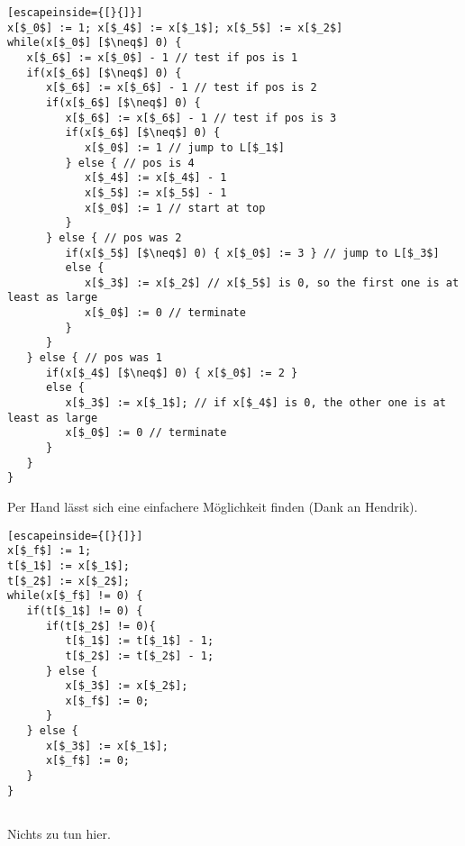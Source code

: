 \documentclass{article}
\begin{document}
\begin{lstlisting}[escapeinside={[}{]}]
x[$_0$] := 1; x[$_4$] := x[$_1$]; x[$_5$] := x[$_2$]
while(x[$_0$] [$\neq$] 0) {
   x[$_6$] := x[$_0$] - 1 // test if pos is 1
   if(x[$_6$] [$\neq$] 0) {
      x[$_6$] := x[$_6$] - 1 // test if pos is 2
      if(x[$_6$] [$\neq$] 0) {
         x[$_6$] := x[$_6$] - 1 // test if pos is 3
         if(x[$_6$] [$\neq$] 0) {
            x[$_0$] := 1 // jump to L[$_1$]
         } else { // pos is 4
            x[$_4$] := x[$_4$] - 1
            x[$_5$] := x[$_5$] - 1
            x[$_0$] := 1 // start at top
         }
      } else { // pos was 2
         if(x[$_5$] [$\neq$] 0) { x[$_0$] := 3 } // jump to L[$_3$]
         else {
            x[$_3$] := x[$_2$] // x[$_5$] is 0, so the first one is at least as large
            x[$_0$] := 0 // terminate
         }
      }
   } else { // pos was 1
      if(x[$_4$] [$\neq$] 0) { x[$_0$] := 2 } 
      else {
         x[$_3$] := x[$_1$]; // if x[$_4$] is 0, the other one is at least as large
         x[$_0$] := 0 // terminate
      }
   }
}
\end{lstlisting}

Per Hand lässt sich eine einfachere Möglichkeit finden (Dank an Hendrik).

\begin{lstlisting}[escapeinside={[}{]}]
x[$_f$] := 1;
t[$_1$] := x[$_1$];
t[$_2$] := x[$_2$];
while(x[$_f$] != 0) {
   if(t[$_1$] != 0) {
      if(t[$_2$] != 0){
         t[$_1$] := t[$_1$] - 1;
         t[$_2$] := t[$_2$] - 1;
      } else {
         x[$_3$] := x[$_2$];
         x[$_f$] := 0;
      }
   } else {
      x[$_3$] := x[$_1$];
      x[$_f$] := 0;
   }
}
\end{lstlisting}

\subsection{} 

Nichts zu tun hier.

\subsection{} 

\end{document}
